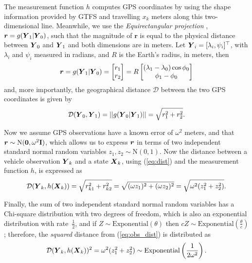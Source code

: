 The measurement function $h$ computes GPS coordinates by using the 
shape information provided by GTFS and travelling $x_k$ meters along 
this two-dimensional line.
Meanwhile, we use the \emph{Equirectangular projection} \citep{Snyder_1998},
$\boldsymbol{r} = g(\mbox{$\boldsymbol{Y}$}_1 | \mbox{$\boldsymbol{Y}$}_0)$,
such that the magnitude of $\boldsymbol{r}$ is equal to the physical distance
between $\mbox{$\boldsymbol{Y}$}_0$ and $\mbox{$\boldsymbol{Y}$}_1$ and both dimensions are in meters.
Let $\mbox{$\boldsymbol{Y}$}_i = [\lambda_i, \psi_i]^\top$,
with $\lambda_i$ and $\psi_i$ measured in radians,  
and $R$ is the Earth's radius, in meters, then
\begin{equation}
\boldsymbol{r} = 
g(\mbox{$\boldsymbol{Y}$}_1 | \mbox{$\boldsymbol{Y}$}_0) = 
    \begin{bmatrix}
        r_1 \\ r_2
    \end{bmatrix} =
    R \begin{bmatrix}
        (\lambda_1 - \lambda_0)\cos\phi_0 \\
        \phi_1 - \phi_0
    \end{bmatrix}
\end{equation}
and, more importantly, the geographical distance $\mathcal{D}$ between the two 
GPS coordinates is given by
\begin{equation}
\label{eq:dist}
\mathcal{D}(\mbox{$\boldsymbol{Y}$}_0, \mbox{$\boldsymbol{Y}$}_1) = ||g(\mbox{$\boldsymbol{Y}$}_0 | \mbox{$\boldsymbol{Y}$}_1)|| = \sqrt{r_1^2 + r_2^2}.
\end{equation}


Now we assume GPS observations have a known error of $\omega^2$ meters,
and that \mbox{$\boldsymbol{r} \sim \mathrm{N}(\boldsymbol{0}, \omega^2\mathbf{I})$},
which allows us to express $\boldsymbol{r}$ in terms of two independent
standard normal random variables $z_1, z_2 \sim \mathrm{N}(0,1)$.
Now the distance between a vehicle observation $\mbox{$\boldsymbol{Y}$}_k$
and a state $\mbox{$\boldsymbol{X}$}_k$, using (\ref{eq:dist}) and the measurement function $h$,
is expressed as
\begin{equation}
\label{eq:obs_dist}
\mathcal{D}(\mbox{$\boldsymbol{Y}$}_k, h(\mbox{$\boldsymbol{X}$}_k)) = \sqrt{r_{k1}^2 + r_{k2}^2} 
    = \sqrt{(\omega z_1)^2 + (\omega z_2)^2}
    = \sqrt{\omega^2 (z_1^2 + z_2^2)}.
\end{equation}

Finally, the sum of two independent 
standard normal random variables has a Chi-square distribution with two degrees of freedom,
which is also an exponential distribution with rate~$\frac{1}{2}$,
and if $Z \sim \mathrm{Exponential}(\theta)$ then
$cZ \sim \mathrm{Exponential}(\frac{\theta}{c})$;
therefore, the \emph{squared} distance from (\ref{eq:obs_dist}) is distributed as
\begin{equation}
\label{eq:obs_exp}
\mathcal{D}(\mbox{$\boldsymbol{Y}$}_k, h(\mbox{$\boldsymbol{X}$}_k))^2 =
\omega^2(z_1^2 + z_2^2) \sim \mathrm{Exponential}\left(\frac{1}{2\omega^2}\right).
\end{equation}

